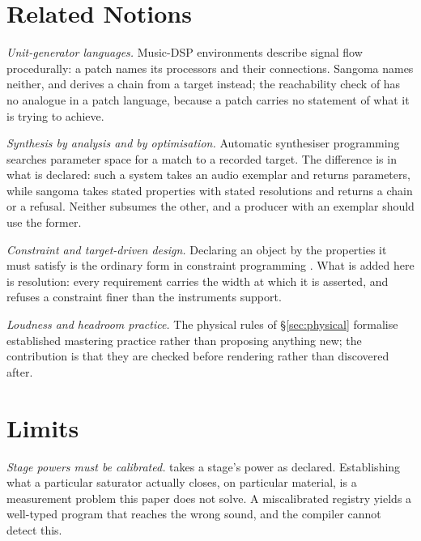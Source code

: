 \documentclass[11pt,twocolumn,a4paper]{article}
\theoremstyle{definition}
\theoremstyle{remark}
\begin{document}
\section{Related Notions}
\label{sec:related}

\emph{Unit-generator languages.} Music-DSP environments
\citep{puckette1996pure,mccartney2002rethinking} describe signal flow
procedurally: a patch names its processors and their connections. Sangoma names
neither, and derives a chain from a target instead; the reachability check of
 has no analogue in a patch language, because a patch carries no
statement of what it is trying to achieve.

\emph{Synthesis by analysis and by optimisation.} Automatic synthesiser
programming \citep{horner1993machine} searches parameter space for a match to a
recorded target. The difference is in what is declared: such a system takes an
audio exemplar and returns parameters, while sangoma takes stated properties with
stated resolutions and returns a chain or a refusal. Neither subsumes the other,
and a producer with an exemplar should use the former.

\emph{Constraint and target-driven design.} Declaring an object by the properties
it must satisfy is the ordinary form in constraint programming
\citep{rossi2006handbook}. What is added here is resolution: every requirement
carries the width at which it is asserted, and  refuses a
constraint finer than the instruments support.

\emph{Loudness and headroom practice.} The physical rules of
\S\ref{sec:physical} formalise established mastering practice
\citep{lund2006stop} rather than proposing anything new; the contribution is that
they are checked before rendering rather than discovered after.

\section{Limits}
\label{sec:limits}

\emph{Stage powers must be calibrated.}  takes a stage's power as
declared. Establishing what a particular saturator actually closes, on particular
material, is a measurement problem this paper does not solve. A miscalibrated
registry yields a well-typed program that reaches the wrong sound, and the
compiler cannot detect this.
\end{document}
